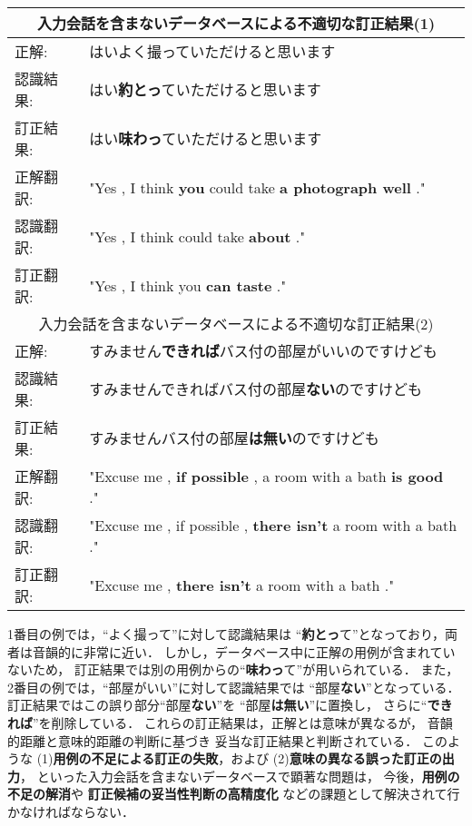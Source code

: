 \begin{center}
\begin{tabular}{|ll|}
\multicolumn{2}{c}{入力会話を含まないデータベースによる不適切な訂正結果(1)}\\
\hline
正解: & はいよく撮っていただけると思います \\
認識結果: & はい{\bf 約とっ}ていただけると思います \\
訂正結果: & はい{\bf 味わっ}ていただけると思います \\
\hline
正解翻訳: & "Yes , I think {\bf you} could take {\bf a photograph well} ." \\
認識翻訳: & "Yes , I think could take {\bf about} ." \\
訂正翻訳: & "Yes , I think you {\bf can taste} ." \\
\hline
\multicolumn{2}{c}{入力会話を含まないデータベースによる不適切な訂正結果(2)}\\
\hline
正解: & すみません{\bf できれば}バス付の部屋がいいのですけども \\
認識結果: & すみませんできればバス付の部屋{\bf ない}のですけども \\
訂正結果: & すみませんバス付の部屋{\bf は無い}のですけども \\
\hline
正解翻訳: & "Excuse me , {\bf if possible} , a room with a bath {\bf is good} ." \\
認識翻訳: & "Excuse me , if possible , {\bf there isn't} a room with a bath ." \\
訂正翻訳: & "Excuse me , {\bf there isn't} a room with a bath ." \\
\hline
\end{tabular}
\end{center}

1番目の例では，``よく撮って''に対して認識結果は
``{\bf 約とっ}て''となっており，両者は音韻的に非常に近い．
しかし，データベース中に正解の用例が含まれていないため，
訂正結果では別の用例からの``{\bf 味わっ}て''が用いられている．
また，2番目の例では，``部屋がいい''に対して認識結果では
``部屋{\bf ない}''となっている．
訂正結果ではこの誤り部分``部屋{\bf ない}''を
``部屋{\bf は無い}''に置換し，
さらに``{\bf できれば}''を削除している．
これらの訂正結果は，正解とは意味が異なるが，
音韻的距離と意味的距離の判断に基づき
妥当な訂正結果と判断されている．
このような
(1){\bf 用例の不足による訂正の失敗}，および
(2){\bf 意味の異なる誤った訂正の出力}，
といった入力会話を含まないデータベースで顕著な問題は，
今後，{\bf 用例の不足の解消}や
{\bf 訂正候補の妥当性判断の高精度化}
などの課題として解決されて行かなければならない．

